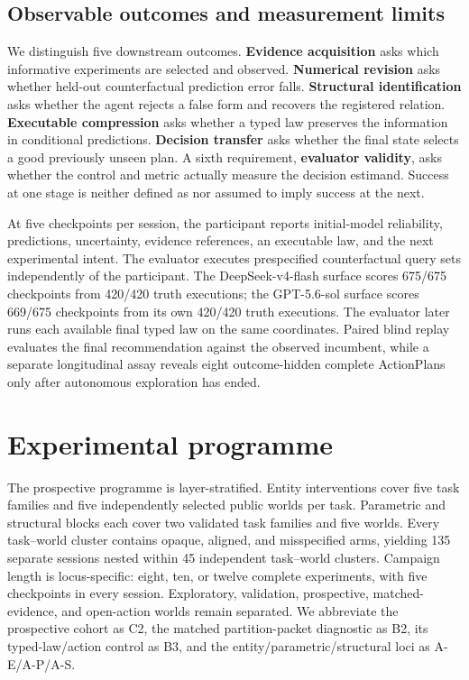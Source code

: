 \documentclass{article}
\begin{document}
\subsection{Observable outcomes and measurement
limits}\label{observable-outcomes-and-measurement-limits}

We distinguish five downstream outcomes. \textbf{Evidence acquisition}
asks which informative experiments are selected and observed.
\textbf{Numerical revision} asks whether held-out counterfactual
prediction error falls. \textbf{Structural identification} asks whether
the agent rejects a false form and recovers the registered relation.
\textbf{Executable compression} asks whether a typed law preserves the
information in conditional predictions. \textbf{Decision transfer} asks
whether the final state selects a good previously unseen plan. A sixth
requirement, \textbf{evaluator validity}, asks whether the control and
metric actually measure the decision estimand. Success at one stage is
neither defined as nor assumed to imply success at the next.

At five checkpoints per session, the participant reports initial-model
reliability, predictions, uncertainty, evidence references, an
executable law, and the next experimental intent. The evaluator executes
prespecified counterfactual query sets independently of the participant.
The DeepSeek-v4-flash surface scores 675/675 checkpoints from 420/420
truth executions; the GPT-5.6-sol surface scores 669/675 checkpoints
from its own 420/420 truth executions. The evaluator later runs each
available final typed law on the same coordinates. Paired blind replay
evaluates the final recommendation against the observed incumbent, while
a separate longitudinal assay reveals eight outcome-hidden complete
ActionPlans only after autonomous exploration has ended.

\section{Experimental programme}\label{experimental-programme}

The prospective programme is layer-stratified. Entity interventions
cover five task families and five independently selected public worlds
per task. Parametric and structural blocks each cover two validated task
families and five worlds. Every task--world cluster contains opaque,
aligned, and misspecified arms, yielding 135 separate sessions nested
within 45 independent task--world clusters. Campaign length is
locus-specific: eight, ten, or twelve complete experiments, with five
checkpoints in every session. Exploratory, validation, prospective,
matched-evidence, and open-action worlds remain separated. We abbreviate
the prospective cohort as C2, the matched partition-packet diagnostic as
B2, its typed-law/action control as B3, and the
entity/parametric/structural loci as A-E/A-P/A-S.
\end{document}
